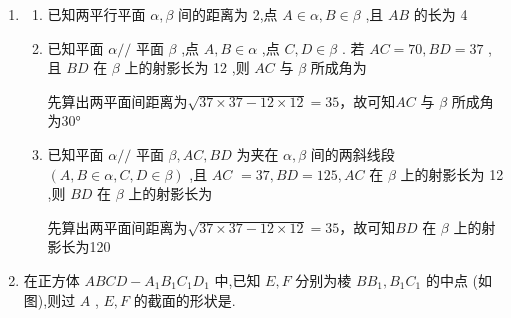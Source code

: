 \begin{enumerate}
\begin{jieda}
    \end{jieda}
    \item \begin{enumerate}
        \item 已知两平行平面 $\alpha ,\beta$ 间的距离为 2,点 $A \in  \alpha ,B \in  \beta$ ,且 ${AB}$ 的长为 4
        \item 已知平面 $\alpha //$ 平面 $\beta$ ,点 $A,B \in  \alpha$ ,点 $C,D \in  \beta$ . 若 ${AC} = {70},{BD} = {37}$ ,且 ${BD}$ 在 $\beta$ 上的射影长为 12 ,则 ${AC}$ 与 $\beta$ 所成角为
        \begin{jieda}
            先算出两平面间距离为$\sqrt{37 \times 37-12\times 12} = 35$，故可知${AC}$ 与 $\beta$ 所成角为$\ang{30}$
        \end{jieda}
        \item 已知平面 $\alpha //$ 平面 $\beta ,{AC},{BD}$ 为夹在 $\alpha ,\beta$ 间的两斜线段 $\left( {A,B \in  \alpha ,C,D \in  \beta }\right)$ ,且 ${AC}$  $= {37},{BD} = {125},{AC}$ 在 $\beta$ 上的射影长为 12 ,则 ${BD}$ 在 $\beta$ 上的射影长为
        \begin{jieda}
            先算出两平面间距离为$\sqrt{37 \times 37-12\times 12} = 35$，故可知${BD}$ 在 $\beta$ 上的射影长为120        
        \end{jieda}
    \end{enumerate}
    \item 在正方体 ${ABCD} - {A}_{1}{B}_{1}{C}_{1}{D}_{1}$ 中,已知 $E,F$ 分别为棱 $B{B}_{1},{B}_{1}{C}_{1}$ 的中点 (如图),则过 $A$ , $E,F$ 的截面的形状是.
    

\end{enumerate}
